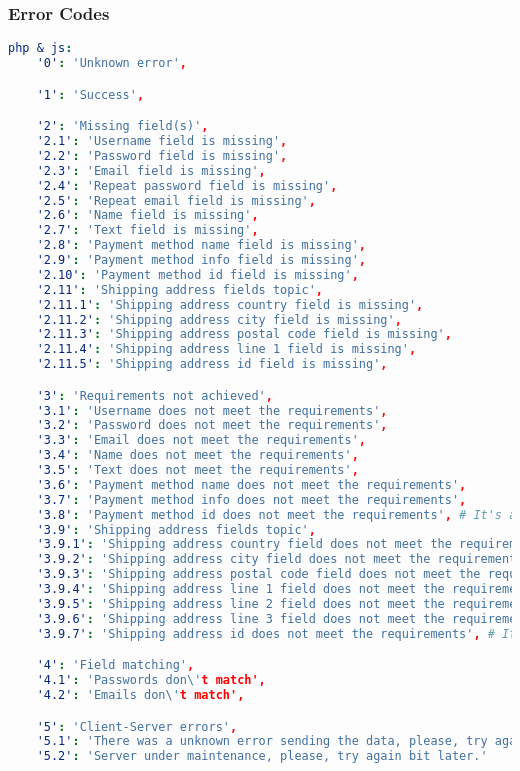 \subsubsection{Error Codes}\label{subsubsec:error-codes}
\begin{lstlisting}[language=yaml,label={lst:errorListing}]
php & js:
    '0': 'Unknown error',

    '1': 'Success',

    '2': 'Missing field(s)',
    '2.1': 'Username field is missing',
    '2.2': 'Password field is missing',
    '2.3': 'Email field is missing',
    '2.4': 'Repeat password field is missing',
    '2.5': 'Repeat email field is missing',
    '2.6': 'Name field is missing',
    '2.7': 'Text field is missing',
    '2.8': 'Payment method name field is missing',
    '2.9': 'Payment method info field is missing',
    '2.10': 'Payment method id field is missing',
    '2.11': 'Shipping address fields topic',
    '2.11.1': 'Shipping address country field is missing',
    '2.11.2': 'Shipping address city field is missing',
    '2.11.3': 'Shipping address postal code field is missing',
    '2.11.4': 'Shipping address line 1 field is missing',
    '2.11.5': 'Shipping address id field is missing',

    '3': 'Requirements not achieved',
    '3.1': 'Username does not meet the requirements',
    '3.2': 'Password does not meet the requirements',
    '3.3': 'Email does not meet the requirements',
    '3.4': 'Name does not meet the requirements',
    '3.5': 'Text does not meet the requirements',
    '3.6': 'Payment method name does not meet the requirements',
    '3.7': 'Payment method info does not meet the requirements',
    '3.8': 'Payment method id does not meet the requirements', # It's a numeric value only
    '3.9': 'Shipping address fields topic',
    '3.9.1': 'Shipping address country field does not meet the requirements',
    '3.9.2': 'Shipping address city field does not meet the requirements',
    '3.9.3': 'Shipping address postal code field does not meet the requirements',
    '3.9.4': 'Shipping address line 1 field does not meet the requirements',
    '3.9.5': 'Shipping address line 2 field does not meet the requirements',
    '3.9.6': 'Shipping address line 3 field does not meet the requirements',
    '3.9.7': 'Shipping address id does not meet the requirements', # It's a numeric value only

    '4': 'Field matching',
    '4.1': 'Passwords don\'t match',
    '4.2': 'Emails don\'t match',

    '5': 'Client-Server errors',
    '5.1': 'There was a unknown error sending the data, please, try again bit later, if this error is consistent please contact an administrator.',
    '5.2': 'Server under maintenance, please, try again bit later.'


\end{lstlisting}
